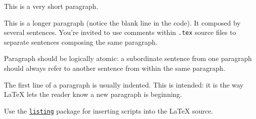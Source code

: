 \documentclass{scrartcl}
\begin{document}
    This is a very short paragraph.

    This is a longer paragraph (notice the blank line in the code).
    It composed by several sentences.
%
    You're invited to use comments within \texttt{.tex} source files to separate sentences composing the same paragraph.

    Paragraph should be logically atomic: a subordinate sentence from one paragraph should always refer to another sentence from within the same paragraph.

    The first line of a paragraph is usually indented.
%
    This is intended: it is the way \LaTeX{} lets the reader know a new paragraph is beginning.

    Use the \href{https://en.wikibooks.org/wiki/LaTeX/Source_Code_Listings}{\texttt{listing}} package for inserting scripts into the \LaTeX{} source.

    \nocite{*} %
    
    
\end{document}
